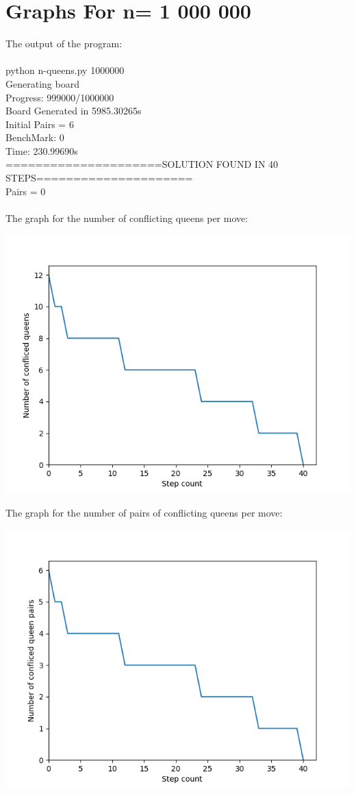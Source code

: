 \documentclass{article}
\begin{document}
\section{Graphs For n= 1 000 000}
The output of the program: \\
\\
python n-queens.py 1000000\\
Generating board\\
Progress: 999000/1000000\\
Board Generated in 5985.30265s\\
Initial Pairs = 6\\
BenchMark: 0\\
Time: 230.99690s\\
=====================SOLUTION FOUND IN 40 STEPS=====================  \\     
Pairs = 0\\
\\
The graph for the number of conflicting queens per move: 
\begin{center}
  \includegraphics[scale=0.6]{n-queens-conflict-count-plot-1000000}
\end{center}
The graph for the number of pairs of conflicting queens per move: 
\begin{center}
  \includegraphics[scale=0.6]{n-queens-conflict-pair-count-plot-1000000}
\end{center}
\end{document}
